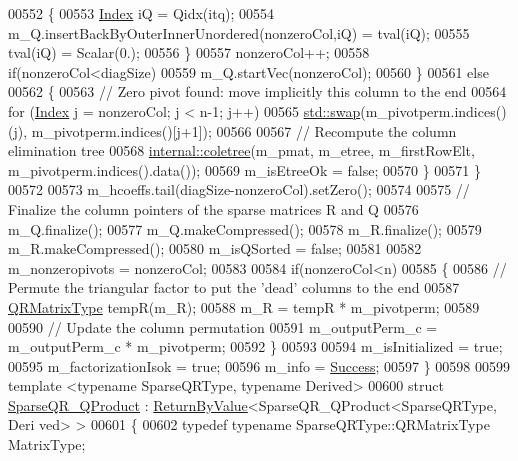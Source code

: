 \begin{DoxyCode}
00552       \{
00553         \hyperlink{namespace_eigen_a62e77e0933482dafde8fe197d9a2cfde}{Index} iQ = Qidx(itq);
00554         m\_Q.insertBackByOuterInnerUnordered(nonzeroCol,iQ) = tval(iQ);
00555         tval(iQ) = Scalar(0.);
00556       \}
00557       nonzeroCol++;
00558       \textcolor{keywordflow}{if}(nonzeroCol<diagSize)
00559         m\_Q.startVec(nonzeroCol);
00560     \}
00561     \textcolor{keywordflow}{else}
00562     \{
00563       \textcolor{comment}{// Zero pivot found: move implicitly this column to the end}
00564       \textcolor{keywordflow}{for} (\hyperlink{namespace_eigen_a62e77e0933482dafde8fe197d9a2cfde}{Index} j = nonzeroCol; j < n-1; j++) 
00565         \hyperlink{endian_8c_a3ca5ecd34b04d6a243c054ac3a57f68d}{std::swap}(m\_pivotperm.indices()(j), m\_pivotperm.indices()[j+1]);
00566       
00567       \textcolor{comment}{// Recompute the column elimination tree}
00568       \hyperlink{namespace_eigen_1_1internal_a86181db74ba596a7afbfd89efcc5788c}{internal::coletree}(m\_pmat, m\_etree, m\_firstRowElt, m\_pivotperm.indices().data());
00569       m\_isEtreeOk = \textcolor{keyword}{false};
00570     \}
00571   \}
00572   
00573   m\_hcoeffs.tail(diagSize-nonzeroCol).setZero();
00574   
00575   \textcolor{comment}{// Finalize the column pointers of the sparse matrices R and Q}
00576   m\_Q.finalize();
00577   m\_Q.makeCompressed();
00578   m\_R.finalize();
00579   m\_R.makeCompressed();
00580   m\_isQSorted = \textcolor{keyword}{false};
00581 
00582   m\_nonzeropivots = nonzeroCol;
00583   
00584   \textcolor{keywordflow}{if}(nonzeroCol<n)
00585   \{
00586     \textcolor{comment}{// Permute the triangular factor to put the 'dead' columns to the end}
00587     \hyperlink{group___sparse_core___module}{QRMatrixType} tempR(m\_R);
00588     m\_R = tempR * m\_pivotperm;
00589     
00590     \textcolor{comment}{// Update the column permutation}
00591     m\_outputPerm\_c = m\_outputPerm\_c * m\_pivotperm;
00592   \}
00593   
00594   m\_isInitialized = \textcolor{keyword}{true}; 
00595   m\_factorizationIsok = \textcolor{keyword}{true};
00596   m\_info = \hyperlink{group__enums_gga85fad7b87587764e5cf6b513a9e0ee5ea52581b035f4b59c203b8ff999ef5fcea}{Success};
00597 \}
00598 
00599 \textcolor{keyword}{template} <\textcolor{keyword}{typename} SparseQRType, \textcolor{keyword}{typename} Derived>
00600 \textcolor{keyword}{struct }\hyperlink{struct_eigen_1_1_sparse_q_r___q_product}{SparseQR\_QProduct} : \hyperlink{group___core___module_class_eigen_1_1_return_by_value}{ReturnByValue}<SparseQR\_QProduct<SparseQRType, Deri
      ved> >
00601 \{
00602   \textcolor{keyword}{typedef} \textcolor{keyword}{typename} SparseQRType::QRMatrixType MatrixType;

\end{DoxyCode}
